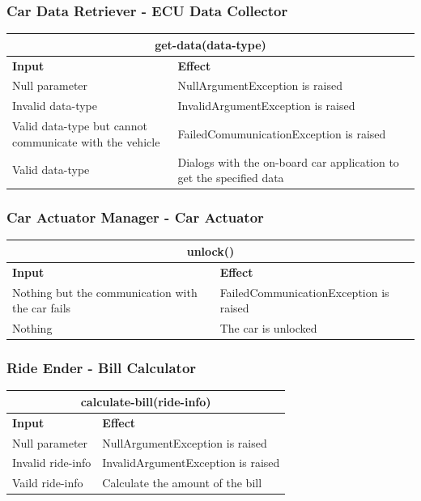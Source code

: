 \documentclass{article}
\begin{document}
\subsubsection{Car Data Retriever - ECU Data Collector}
\begin{tabular}{ |p{5cm}|p{7cm}| }
  \hline
  \multicolumn{2}{|c|}{get-data(data-type)} \\
  \hline
  \textbf{Input} & \textbf{Effect} \\
  \hline
  Null parameter & NullArgumentException is raised\\
  \hline
  Invalid data-type & InvalidArgumentException is raised\\
  \hline
  Valid data-type but cannot communicate with the vehicle & FailedComumunicationException is raised\\
  \hline
   Valid data-type & Dialogs with the on-board car application to get the specified data\\
  \hline
\end{tabular}
\subsubsection{Car Actuator Manager - Car Actuator}
\begin{tabular}{ |p{5cm}|p{7cm}| }
  \hline
  \multicolumn{2}{|c|}{unlock()} \\
  \hline
  \textbf{Input} & \textbf{Effect} \\
  \hline
  Nothing but the communication with the car fails & FailedCommunicationException is raised\\
  \hline
  Nothing & The car is unlocked \\
  \hline
\end{tabular}
\subsubsection{Ride Ender - Bill Calculator}
\begin{tabular}{ |p{5cm}|p{7cm}| }
  \hline
  \multicolumn{2}{|c|}{calculate-bill(ride-info)} \\
  \hline
  \textbf{Input} & \textbf{Effect} \\
  \hline
  Null parameter & NullArgumentException is raised\\
  \hline
  Invalid ride-info & InvalidArgumentException is raised \\
  \hline
  Vaild ride-info & Calculate the amount of the bill\\
  \hline
\end{tabular}
\end{document}
